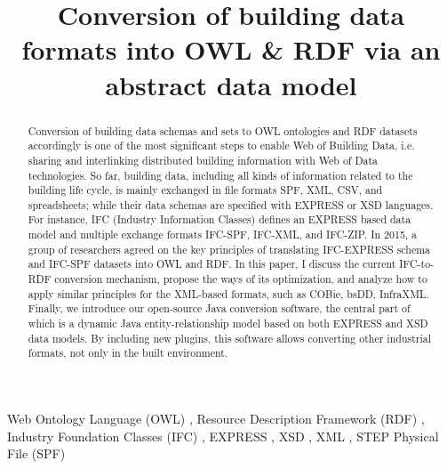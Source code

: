 \begin{frontmatter}

\title{Conversion of building data formats into OWL \& RDF via an abstract data model}



\author{ }
\address{Aalto University, Espoo, Finland\\Email: nam.vuhoang@aalto.fi}
\runningauthor{}

\begin{abstract}
Conversion of building data schemas and sets to OWL ontologies and RDF datasets accordingly is one of the most significant steps to enable Web of Building Data, i.e. sharing and interlinking distributed building information with Web of Data technologies.
So far, building data, including all kinds of information related to the building life cycle, is mainly exchanged in file formats SPF, XML, CSV, and spreadsheets; while their data schemas are specified with EXPRESS or XSD languages.
For instance, IFC (Industry Information Classes) defines an EXPRESS based data model and multiple exchange formats IFC-SPF, IFC-XML, and IFC-ZIP.
In 2015, a group of researchers agreed on the key principles of translating IFC-EXPRESS schema and IFC-SPF datasets into OWL and RDF.
In this paper, I discuss the current IFC-to-RDF conversion mechanism, propose the ways of its optimization, and analyze how to apply similar principles for the XML-based formats, such as COBie, bsDD, InfraXML.
Finally, we introduce our open-source Java conversion software, the central part of which is a dynamic Java entity-relationship model based on both EXPRESS and XSD data models.
By including new plugins, this software allows converting other industrial formats, not only in the built environment. 
 
\end{abstract}

\begin{keyword}
 Web Ontology Language (OWL)
 \sep
 Resource Description Framework (RDF)
 \sep
 Industry Foundation Classes (IFC)
 \sep
 EXPRESS
 \sep
 XSD
 \sep
 XML
 \sep
 STEP Physical File (SPF)
\end{keyword}

\end{frontmatter}